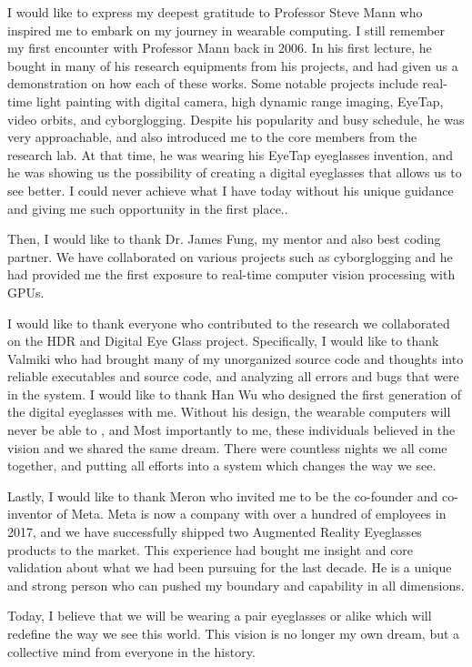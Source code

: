 I would like to express my deepest gratitude to Professor Steve Mann who inspired me to embark on my journey in wearable computing. I still remember my first encounter with Professor Mann back in 2006. In his first lecture, he bought in many of his research equipments from his projects, and had given us a demonstration on how each of these works. Some notable projects include real-time light painting with digital camera, high dynamic range imaging, EyeTap, video orbits, and cyborglogging. Despite his popularity and busy schedule, he was very approachable, and also introduced me to the core members from the research lab. At that time, he was wearing his EyeTap eyeglasses invention, and he was showing us the possibility of creating a digital eyeglasses that allows us to see better. I could never achieve what I have today without his unique guidance and giving me such opportunity in the first place.. 

Then, I would like to thank Dr. James Fung, my mentor and also best coding partner. We have collaborated on various projects such as cyborglogging and he had provided me the first exposure to real-time computer vision processing with GPUs.

I would like to thank everyone who contributed to the research we collaborated on the HDR and Digital Eye Glass project. Specifically, I would like to thank Valmiki who had brought many of my unorganized source code and thoughts into reliable executables and source code, and analyzing all errors and bugs that were in the system. I would like to thank Han Wu who designed the first generation of the digital eyeglasses with me. Without his design, the wearable computers will never be able to  , and Most importantly to me, these individuals believed in the vision and we shared the same dream. There were countless nights we all come together, and putting all efforts into a system which changes the way we see. 
 
Lastly, I would like to thank Meron who invited me to be the co-founder and co-inventor of Meta. Meta is now a company with over a hundred of employees in 2017, and we have successfully shipped two Augmented Reality Eyeglasses products to the market. This experience had bought me insight and core validation about what we had been pursuing for the last decade. He is a unique and strong person who can pushed my boundary and capability in all dimensions.

Today, I believe that we will be wearing a pair eyeglasses or alike which will redefine the way we see this world. This vision is no longer my own dream, but a collective mind from everyone in the history.